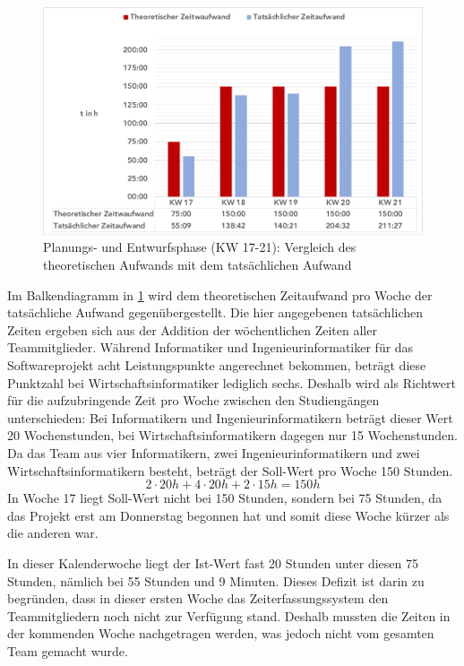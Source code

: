 \documentclass[../review_3.tex]{subfiles}
\begin{document}
\begin{figure} [h]
    \centering
    \includegraphics[width = \linewidth]{img/Kimai2.pdf}
    \caption{Planungs- und Entwurfsphase (KW 17-21): Vergleich des theoretischen Aufwands mit dem tatsächlichen Aufwand}
    \label{sollist}
\end{figure}

Im Balkendiagramm in \ref{sollist} wird dem theoretischen Zeitaufwand pro Woche der tatsächliche Aufwand gegenübergestellt. Die hier angegebenen tatsächlichen Zeiten ergeben sich aus der Addition der wöchentlichen Zeiten aller Teammitglieder.
Während Informatiker und Ingenieurinformatiker für das Softwareprojekt acht Leistungspunkte angerechnet bekommen, beträgt diese Punktzahl bei Wirtschaftsinformatiker lediglich sechs. Deshalb wird als Richtwert für die aufzubringende Zeit pro Woche zwischen den Studiengängen unterschieden: Bei Informatikern und Ingenieurinformatikern beträgt dieser Wert 20 Wochenstunden, bei Wirtschaftsinformatikern dagegen nur 15 Wochenstunden.
Da das Team aus vier Informatikern, zwei Ingenieurinformatikern und zwei Wirtschaftsinformatikern besteht, beträgt der Soll-Wert pro Woche 150 Stunden.
\begin{equation*}
    2\cdot 20h + 4\cdot 20h + 2\cdot 15h = 150h
\end{equation*}
In Woche 17 liegt Soll-Wert nicht bei 150 Stunden, sondern bei 75 Stunden, da das Projekt erst am Donnerstag begonnen hat und somit diese Woche kürzer als die anderen war.

In dieser Kalenderwoche liegt der Ist-Wert fast 20 Stunden unter diesen 75 Stunden, nämlich bei 55 Stunden und 9 Minuten. Dieses Defizit ist darin zu begründen, dass in dieser ersten Woche das Zeiterfassungssystem den Teammitgliedern noch nicht zur Verfügung stand. Deshalb mussten die Zeiten in der kommenden Woche nachgetragen werden, was jedoch nicht vom gesamten Team gemacht wurde.
\end{document}
